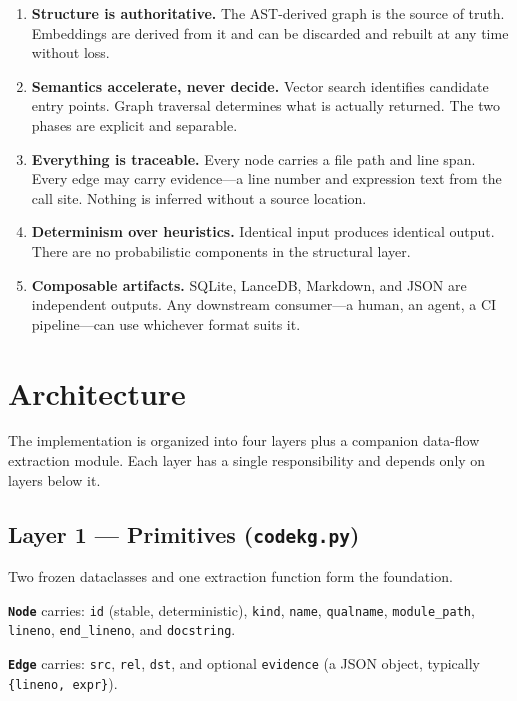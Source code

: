 \documentclass[10pt]{article}
\begin{document}
\begin{enumerate}
\item \textbf{Structure is authoritative.}
The AST-derived graph is the source of truth. Embeddings are derived from it and
can be discarded and rebuilt at any time without loss.

\item \textbf{Semantics accelerate, never decide.}
Vector search identifies candidate entry points. Graph traversal determines what
is actually returned. The two phases are explicit and separable.

\item \textbf{Everything is traceable.}
Every node carries a file path and line span. Every edge may carry evidence---a
line number and expression text from the call site. Nothing is inferred without
a source location.

\item \textbf{Determinism over heuristics.}
Identical input produces identical output. There are no probabilistic components
in the structural layer.

\item \textbf{Composable artifacts.}
SQLite, LanceDB, Markdown, and JSON are independent outputs. Any downstream
consumer---a human, an agent, a CI pipeline---can use whichever format suits it.
\end{enumerate}

\section{Architecture}

The implementation is organized into four layers plus a companion data-flow
extraction module. Each layer has a single responsibility and depends only on
layers below it.

\subsection{Layer 1 --- Primitives (\texttt{codekg.py})}

Two frozen dataclasses and one extraction function form the foundation.

\textbf{\texttt{Node}} carries: \texttt{id} (stable, deterministic), \texttt{kind},
\texttt{name}, \texttt{qualname}, \texttt{module\_path}, \texttt{lineno},
\texttt{end\_lineno}, and \texttt{docstring}.

\textbf{\texttt{Edge}} carries: \texttt{src}, \texttt{rel}, \texttt{dst}, and
optional \texttt{evidence} (a JSON object, typically \texttt{\{lineno, expr\}}).
\end{document}
